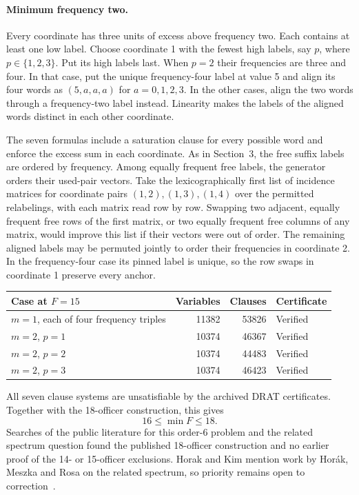 \documentclass[11pt]{article}
\begin{document}
\paragraph{Minimum frequency two.}
Every coordinate has three units of excess above frequency two.
Each contains at least one low label. Choose coordinate 1 with the
fewest high labels, say \(p\), where \(p\in\{1,2,3\}\).
Put its high labels last. When \(p=2\) their frequencies are
three and four. In that case, put the unique frequency-four label
at value 5 and align its four words as \((5,a,a,a)\) for
\(a=0,1,2,3\). In the other cases, align the two words through a
frequency-two label instead. Linearity makes the labels of the
aligned words distinct in each other coordinate.

The seven formulas include a saturation clause for every possible
word and enforce the excess sum in each coordinate. As in Section~3,
the free suffix labels are ordered by frequency. Among equally
frequent free labels, the generator orders their used-pair vectors.
Take the lexicographically first list of incidence matrices for
coordinate pairs \((1,2),(1,3),(1,4)\) over the permitted
relabelings, with each matrix read row by row. Swapping two
adjacent, equally frequent free rows of the first matrix, or two
equally frequent free columns of any matrix, would improve this
list if their vectors were out of order. The remaining aligned
labels may be permuted jointly to order their frequencies in
coordinate 2. In the frequency-four case its pinned label is
unique, so the row swaps in coordinate 1 preserve every anchor.

\begin{center}
\begin{tabular}{@{}lrrl@{}}
Case at \(F=15\) & Variables & Clauses & Certificate\\
\hline
\(m=1\), each of four frequency triples & 11382 & 53826 & Verified\\
\(m=2\), \(p=1\) & 10374 & 46367 & Verified\\
\(m=2\), \(p=2\) & 10374 & 44483 & Verified\\
\(m=2\), \(p=3\) & 10374 & 46423 & Verified
\end{tabular}
\end{center}

All seven clause systems are unsatisfiable by the archived DRAT
certificates. Together with the 18-officer construction, this gives
\[
16\le \min F\le18.
\]
Searches of the public literature for this order-6 problem and the
related spectrum question found the published 18-officer
construction and no earlier proof of the 14- or 15-officer
exclusions. Horak and Kim mention work by Hor\'ak, Meszka and Rosa
on the related spectrum, so priority remains open to correction~\cite{room}.
\end{document}
